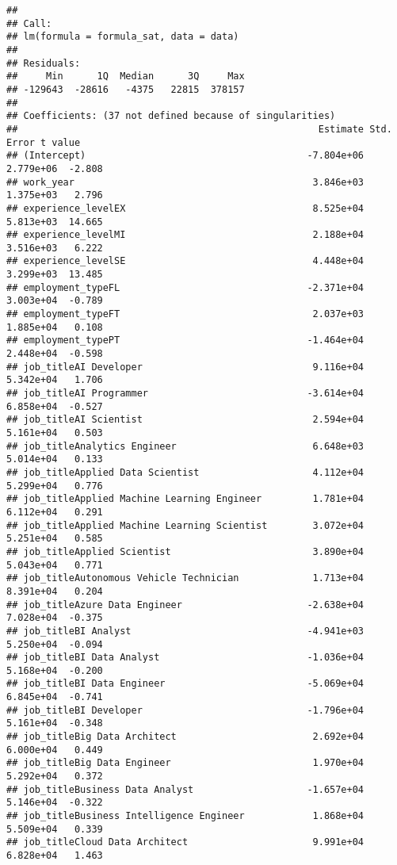 \documentclass[
]{article}
\begin{document}
\begin{verbatim}
## 
## Call:
## lm(formula = formula_sat, data = data)
## 
## Residuals:
##     Min      1Q  Median      3Q     Max 
## -129643  -28616   -4375   22815  378157 
## 
## Coefficients: (37 not defined because of singularities)
##                                                     Estimate Std. Error t value
## (Intercept)                                       -7.804e+06  2.779e+06  -2.808
## work_year                                          3.846e+03  1.375e+03   2.796
## experience_levelEX                                 8.525e+04  5.813e+03  14.665
## experience_levelMI                                 2.188e+04  3.516e+03   6.222
## experience_levelSE                                 4.448e+04  3.299e+03  13.485
## employment_typeFL                                 -2.371e+04  3.003e+04  -0.789
## employment_typeFT                                  2.037e+03  1.885e+04   0.108
## employment_typePT                                 -1.464e+04  2.448e+04  -0.598
## job_titleAI Developer                              9.116e+04  5.342e+04   1.706
## job_titleAI Programmer                            -3.614e+04  6.858e+04  -0.527
## job_titleAI Scientist                              2.594e+04  5.161e+04   0.503
## job_titleAnalytics Engineer                        6.648e+03  5.014e+04   0.133
## job_titleApplied Data Scientist                    4.112e+04  5.299e+04   0.776
## job_titleApplied Machine Learning Engineer         1.781e+04  6.112e+04   0.291
## job_titleApplied Machine Learning Scientist        3.072e+04  5.251e+04   0.585
## job_titleApplied Scientist                         3.890e+04  5.043e+04   0.771
## job_titleAutonomous Vehicle Technician             1.713e+04  8.391e+04   0.204
## job_titleAzure Data Engineer                      -2.638e+04  7.028e+04  -0.375
## job_titleBI Analyst                               -4.941e+03  5.250e+04  -0.094
## job_titleBI Data Analyst                          -1.036e+04  5.168e+04  -0.200
## job_titleBI Data Engineer                         -5.069e+04  6.845e+04  -0.741
## job_titleBI Developer                             -1.796e+04  5.161e+04  -0.348
## job_titleBig Data Architect                        2.692e+04  6.000e+04   0.449
## job_titleBig Data Engineer                         1.970e+04  5.292e+04   0.372
## job_titleBusiness Data Analyst                    -1.657e+04  5.146e+04  -0.322
## job_titleBusiness Intelligence Engineer            1.868e+04  5.509e+04   0.339
## job_titleCloud Data Architect                      9.991e+04  6.828e+04   1.463

\end{verbatim}
\end{document}
